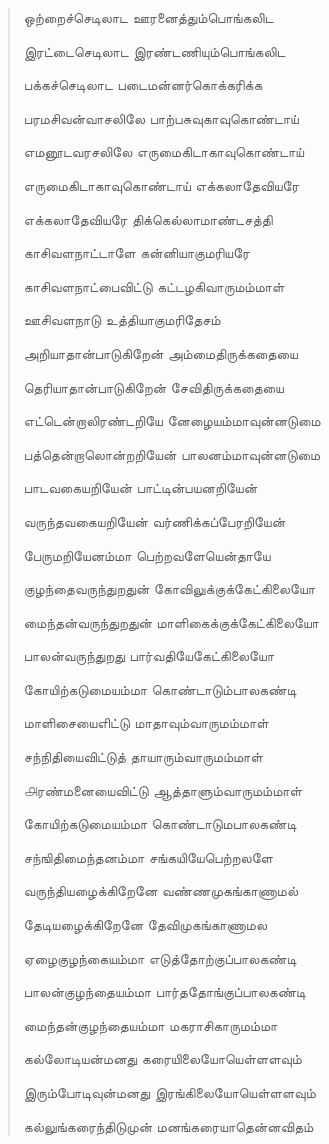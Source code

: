 \documentclass{article}
\begin{document}
\begin{quotation}
{ஒற்றைச்செடிலாட ஊரனைத்தும்பொங்கலிட

இரட்டைசெடிலாட இரண்டணியும்பொங்கலிட

பக்கச்செடிலாட படைமன்னர்கொக்கரிக்க

பரமசிவன்வாசலிலே பாற்பசுவுகாவுகொண்டாய்

எமனூடவரசலிலே எருமைகிடாகாவுகொண்டாய்

எருமைகிடாகாவுகொண்டாய் எக்கலாதேவியரே

எக்கலாதேவியரே திக்கெல்லாமாண்டசத்தி

காசிவளநாட்டாளே கன்னியாகுமரியரே

காசிவளநாட்பைவிட்டு கட்டழகிவாருமம்மாள்

ஊசிவளநாடு உத்தியாகுமரிதேசம்

அறியாதான்பாடுகிறேன் அம்மைதிருக்கதையை

தெரியாதான்பாடுகிறேன் சேவிதிருக்கதையை

எட்டென்றாலிரண்டறியே னேழையம்மாவுன்னடுமை

பத்தென்றாலொன்றறியேன் பாலனம்மாவுன்னடுமை

பாடவகையறியேன் பாட்டின்பயனறியேன்

வருந்தவகையறியேன் வர்ணிக்கப்பேரறியேன்

பேருமறியேனம்மா பெற்றவளேயென்தாயே

குழந்தைவருந்துறதுன் கோவிலுக்குக்கேட்கிலையோ

மைந்தன்வருந்துறதுன் மாளிகைக்குக்கேட்கிலையோ

பாலன்வருந்துறது பார்வதியேகேட்கிலையோ

கோயிற்கடுமையம்மா கொண்டாடும்பாலகண்டி

மாளிசையைஎிட்டு மாதாவும்வாருமம்மாள்

சந்நிதியைவிட்டுத் தாயாரும்வாருமம்மாள்

௮ரண்மனையைவிட்டு ஆத்தாளும்வாருமம்மாள்

கோயிற்கடுமையம்மா கொண்டாடுமபாலகண்டி

சந்ஙிதிமைந்தனம்மா சங்கயியேபெற்றலளே

வருந்தியழைக்கிறேனே வண்ணமுகங்காணாமல்

தேடியழைக்கிறேனே தேவிமுகங்காணாமல

ஏழைகுழந்கையம்மா எடுத்தோற்குப்பாலகண்டி

பாலன்குழந்தையம்மா பார்ததோங்குப்பாலகண்டி

மைந்தன்குழந்தையம்மா மகராசிகாருமம்மா

கல்லோடியன்மனது கரையிலையோயெள்ளளவும்

இரும்போடிவுன்மனது இரங்கிலையோயெள்ளளவும்

கல்லுங்கரைந்திடுமுன் மனங்கரையாதென்னவிதம்

}
\end{quotation}
\end{document}
